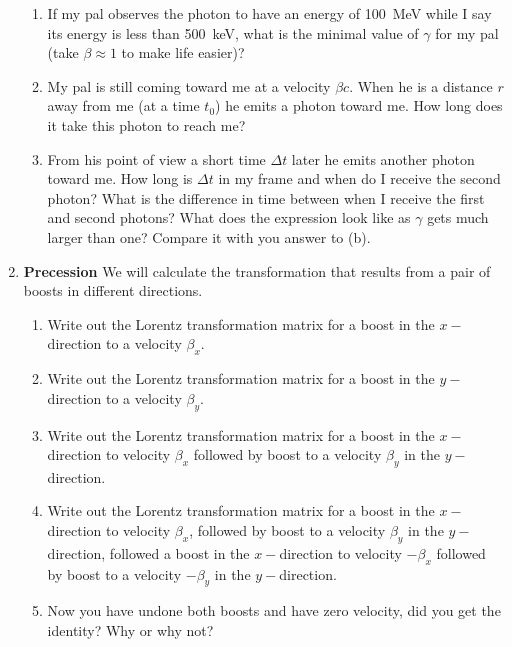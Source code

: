 \begin{enumerate}
\begin{enumerate}
\item If my pal observes the photon to have an energy of 100~MeV while
  I say its energy is less than 500~keV, what is the minimal value of
  $\gamma$ for my pal (take $\beta \approx 1$ to make life easier)?

\item My pal is still coming toward me at a velocity $\beta c$. When
  he is a distance $r$ away from me (at a time $t_0$) he emits a photon
  toward me. How long does it take this photon to reach me?

\item From his point of view a short time $\Delta t$ later he emits
  another photon toward me. How long is $\Delta t$ in my frame and
  when do I receive the second photon? What is the difference in time
  between when I receive the first and second photons? What does the
  expression look like as $\gamma$ gets much larger than one? Compare
  it with you answer to (b).
\end{enumerate}

\item{\bf Precession}
We will calculate the transformation that results from a pair of
boosts in different directions.
\begin{enumerate}
\item Write out the Lorentz transformation matrix for a boost in the
  $x-$direction to a velocity $\beta_x$.
\item Write out the Lorentz transformation matrix for a boost in the
  $y-$direction to a velocity $\beta_y$.
\item
  Write out the Lorentz transformation matrix for a boost in the
  $x-$direction to velocity $\beta_x$ followed by boost to a velocity
  $\beta_y$ in the $y-$direction.
\item
  Write out the Lorentz transformation matrix for a boost in the
  $x-$direction to velocity $\beta_x$, followed by boost to a velocity
  $\beta_y$ in the $y-$direction, followed a boost in the
  $x-$direction to velocity $-\beta_x$ followed by boost to a velocity
  $-\beta_y$ in the $y-$direction.  
\item Now you have undone both boosts and have zero velocity, did you
  get the identity?  Why or why not?
\end{enumerate}

\end{enumerate}
